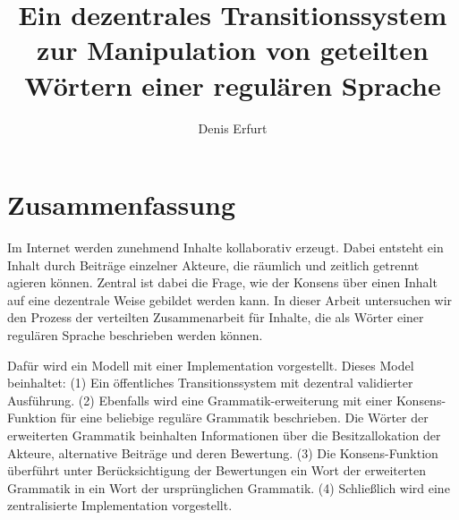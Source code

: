 \documentclass[a4paper,12pt]{report}
\author{Denis Erfurt}
\date{\now}
\title{Ein dezentrales Transitionssystem zur Manipulation von geteilten Wörtern einer regulären Sprache}
\begin{document}







\section*{Zusammenfassung}


% 
% 
% 







Im Internet werden zunehmend Inhalte kollaborativ erzeugt. 
Dabei entsteht ein Inhalt durch Beiträge einzelner Akteure, die räumlich und zeitlich getrennt agieren können.
Zentral ist dabei die Frage, wie der Konsens über einen Inhalt auf eine dezentrale Weise gebildet werden kann.
In dieser Arbeit untersuchen wir den Prozess der verteilten Zusammenarbeit für Inhalte, die als Wörter einer regulären Sprache beschrieben werden können. 

Dafür wird ein Modell mit einer Implementation vorgestellt. Dieses Model beinhaltet: 
(1) Ein öffentliches Transitionssystem mit dezentral validierter Ausführung. 
(2) Ebenfalls wird eine Grammatik-erweiterung mit einer Konsens-Funktion für eine beliebige reguläre Grammatik beschrieben. Die Wörter der erweiterten Grammatik beinhalten Informationen über die Besitzallokation der Akteure, alternative Beiträge und deren Bewertung. 
(3) Die Konsens-Funktion überführt unter Berücksichtigung der Bewertungen ein Wort der erweiterten Grammatik in ein Wort der ursprünglichen Grammatik. (4) Schließlich wird eine zentralisierte Implementation vorgestellt.
\end{document}
